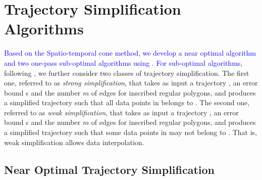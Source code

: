 \section{Trajectory Simplification Algorithms}

\label{sec-alg}
\textcolor{blue}{Based on the Spatio-temporal cone method, we develop a near optimal algorithm and two one-pass sub-optimal algorithms using \sed. For sub-optimal algorithms,} following \cite{Trajcevski:DDR,Lin:Operb}, we further consider two classes of trajectory simplification.
The first one, referred to as \emph{strong simplification}, that takes as input a trajectory , an error bound $\epsilon$ and the number $m$ of edges for inscribed regular polygons, and produces a simplified trajectory  such that all data points in  belongs to .
The second one, referred to as \emph{weak simplification}, that takes as input a trajectory , an error bound $\epsilon$ and the number $m$ of edges for inscribed regular polygons, and produces a simplified trajectory  such that some data points in  may not belong to . That is,  weak simplification allows data interpolation. %


\subsection{Near Optimal Trajectory Simplification}


